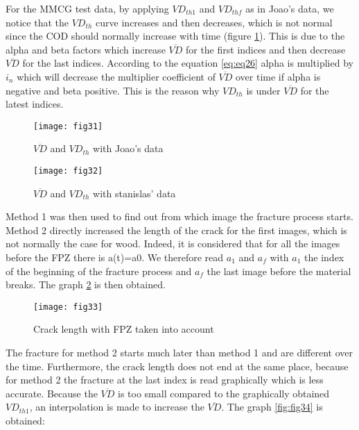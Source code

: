 For the MMCG test data, by applying $VD_{th1}$ and $VD_{thf}$ as in Joao's data, we notice that the $VD_{th}$ curve increases and then decreases, which is not normal since the COD should normally increase with time (figure \ref{fig:fig32}). This is due to the alpha and beta factors which increase $\overline{VD}$ for the first indices and then decrease $\overline{VD}$ for the last indices. According to the equation \ref{eq:eq26} alpha is multiplied by $i_n$ which will decrease the multiplier coefficient of $\overline{VD}$ over time if alpha is negative and beta positive. This is the reason why $VD_{th}$ is under $\overline{VD}$  for the latest indices.

\begin{figure}[htp]
	\begin{minipage}[c]{.46\linewidth}
		\centering
		\texttt{[image: fig31]}
		\caption{$\overline{VD}$ and $VD_{th}$ with Joao's data}
		\label{fig:fig31}
	\end{minipage}
	\hfill%
	\begin{minipage}[c]{.46\linewidth}
		\centering
		\texttt{[image: fig32]}
		\caption{$\overline{VD}$ and $VD_{th}$ with stanislas' data}
		\label{fig:fig32}
	\end{minipage}
\end{figure}


Method 1 was then used to find out from which image the fracture process starts. Method 2 directly increased the length of the crack for the first images, which is not normally the case for wood.  Indeed, it is considered that for all the images before the FPZ there is a(t)=a0. We therefore read $a_1$ and $a_f$ with $a_1$ the index of the beginning of the fracture process and $a_f$ the last image before the material breaks. The graph \ref{fig:fig33} is then obtained.


\begin{figure}[htp]
	\centering
	\texttt{[image: fig33]}
	\caption{Crack length with FPZ taken into account}
	\label{fig:fig33}
\end{figure}

The fracture for method 2 starts much later than method 1 and are different over the time. Furthermore, the crack length does not end at the same place, because for method 2 the fracture at the last index is read graphically which is less accurate.
Because the $\overline{VD}$ is too small compared to the graphically obtained $VD_{th1}$, an interpolation is made to increase the $\overline{VD}$. The graph \ref{fig:fig34} is obtained:

